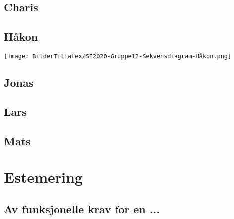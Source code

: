 \documentclass[12pt]{article}
\begin{document}
    \subsection{Charis}

    \newpage
    \subsection{Håkon}

    \texttt{[image: BilderTilLatex/SE2020-Gruppe12-Sekvensdiagram-Håkon.png]}


    \subsection{Jonas}

    \subsection{Lars}

    \subsection{Mats}

\section{Estemering}

    \subsection{Av funksjonelle krav for en ...}
\end{document}
